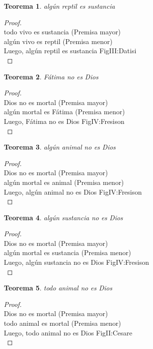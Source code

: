 ﻿\documentclass[12pt]{book}
\newtheorem{theorem}{Teorema}[chapter]
\newtheorem{proof}{Demostración}
\begin{document}
\begin{theorem}
algún reptil es sustancia
\label{th: 64}
\end{theorem}\begin{proof}\\todo vivo es sustancia	 (Premisa mayor) \\algún vivo es reptil	 (Premisa menor) \\Luego, algún reptil es sustancia	FigIII:Datisi \\ \end{proof}
\begin{theorem}
Fátima no es Dios
\label{th: 65}
\end{theorem}\begin{proof}\\Dios no es mortal	 (Premisa mayor) \\algún mortal es Fátima	 (Premisa menor) \\Luego, Fátima no es Dios	FigIV:Fresison \\ \end{proof}
\begin{theorem}
algún animal no es Dios
\label{th: 66}
\end{theorem}\begin{proof}\\Dios no es mortal	 (Premisa mayor) \\algún mortal es animal	 (Premisa menor) \\Luego, algún animal no es Dios	FigIV:Fresison \\ \end{proof}
\begin{theorem}
algún sustancia no es Dios
\label{th: 67}
\end{theorem}\begin{proof}\\Dios no es mortal	 (Premisa mayor) \\algún mortal es sustancia	 (Premisa menor) \\Luego, algún sustancia no es Dios	FigIV:Fresison \\ \end{proof}
\begin{theorem}
todo animal no es Dios
\label{th: 68}
\end{theorem}\begin{proof}\\Dios no es mortal	 (Premisa mayor) \\todo animal es mortal	 (Premisa menor) \\Luego, todo animal no es Dios	FigII:Cesare \\ \end{proof}
\end{document}
